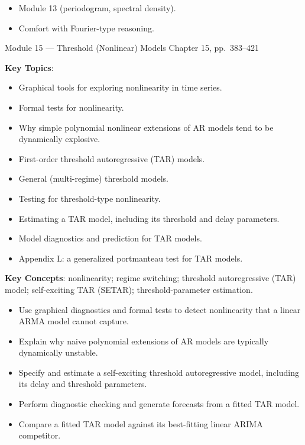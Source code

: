 \documentclass[11pt]{article}
\newcommand{\keytopics}{\textbf{\color{modblue}Key Topics}}
\newcommand{\keyconcepts}{\textbf{\color{modblue}Key Concepts}}
\begin{document}
\begin{prereqs}
\begin{itemize}
  \item Module 13 (periodogram, spectral density).
  \item Comfort with Fourier-type reasoning.
\end{itemize}
\end{prereqs}

\vspace{6pt}
\begin{moduletitle}{Module 15 --- Threshold (Nonlinear) Models}
\small Chapter 15, pp.\ 383--421
\end{moduletitle}

\keytopics:
\begin{itemize}
  \item Graphical tools for exploring nonlinearity in time series.
  \item Formal tests for nonlinearity.
  \item Why simple polynomial nonlinear extensions of AR models tend to be dynamically explosive.
  \item First-order threshold autoregressive (TAR) models.
  \item General (multi-regime) threshold models.
  \item Testing for threshold-type nonlinearity.
  \item Estimating a TAR model, including its threshold and delay parameters.
  \item Model diagnostics and prediction for TAR models.
  \item Appendix L: a generalized portmanteau test for TAR models.
\end{itemize}

\keyconcepts: nonlinearity; regime switching; threshold autoregressive (TAR) model; self-exciting TAR (SETAR); threshold-parameter estimation.

\begin{objectives}
\begin{itemize}
  \item Use graphical diagnostics and formal tests to detect nonlinearity that a linear ARMA model cannot capture.
  \item Explain why naive polynomial extensions of AR models are typically dynamically unstable.
  \item Specify and estimate a self-exciting threshold autoregressive model, including its delay and threshold parameters.
  \item Perform diagnostic checking and generate forecasts from a fitted TAR model.
  \item Compare a fitted TAR model against its best-fitting linear ARIMA competitor.
\end{itemize}
\end{objectives}
\end{document}
